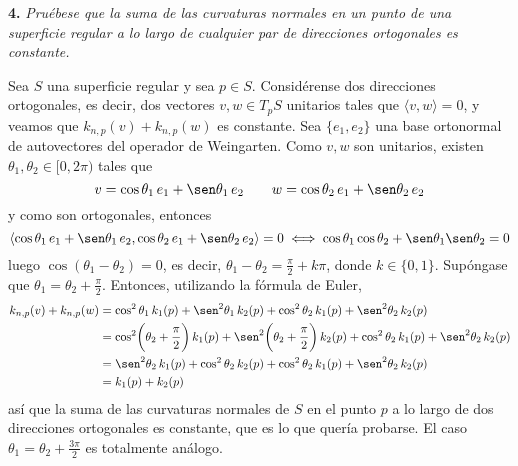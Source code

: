 \documentclass[12pt]{report}
\begin{document}
\vspace{4mm}
\textbf{4.} \textit{Pruébese que la suma de las curvaturas normales en un punto de una superficie regular a lo largo de cualquier par de direcciones ortogonales es constante.} 

\vspace{2mm}
Sea $S$ una superficie regular y sea $p \in S$. Considérense dos direcciones ortogonales, es decir, dos vectores $v,w \in T_pS$ unitarios tales que $\langle v,w \rangle =0$, y veamos que $k_{n,p}(v)+k_{n,p}(w)$ es constante. Sea $\{e_1,e_2\}$ una base ortonormal de autovectores del operador de Weingarten. Como $v,w$ son unitarios, existen $\theta_1,\theta_2 \in [0,2\pi)$ tales que
\[v = \cos\theta_1 \, e_1+\sen\theta_1 \, e_2 \qquad w = \cos\theta_2 \, e_1+\sen\theta_2 \, e_2\]
y como son ortogonales, entonces
\[
\langle \cos\theta_1 \, e_1+\sen\theta_1 \, e_2, \cos\theta_2 \, e_1+\sen\theta_2 \, e_2 \rangle = 0 \iff \cos \theta_1 \cos \theta_2 + \sen\theta_1 \sen\theta_2 = 0
\]
luego $\cos(\theta_1-\theta_2) = 0$, es decir, $\theta_1-\theta_2 = \frac{\pi}{2}+k\pi$, donde $k \in \{0,1\}$. Supóngase que $\theta_1 = \theta_2 + \frac{\pi}{2}$. Entonces, utilizando la fórmula de Euler,
\[
\begin{aligned}[t]
    k_{n,p}(v)+k_{n,p}(w) &= \cos^2\theta_1 \, k_1(p)+\sen^2\theta_1 \, k_2(p)+\cos^2\theta_2 \, k_1(p)+\sen^2\theta_2 \, k_2(p) \\
    &= \cos^2\biggl(\theta_2+\frac{\pi}{2} \biggr) \, k_1(p)+\sen^2 \biggl(\theta_2+\frac{\pi}{2} \biggr) \, k_2(p) + \cos^2\theta_2 \, k_1(p)+\sen^2\theta_2 \, k_2(p) \\
    &= \sen^2\theta_2 \, k_1(p)+\cos^2\theta_2 \, k_2(p) + \cos^2\theta_2 \, k_1(p)+\sen^2\theta_2 \, k_2(p) \\
    &= k_1(p)+k_2(p)
\end{aligned}
\]
así que la suma de las curvaturas normales de $S$ en el punto $p$ a lo largo de dos direcciones ortogonales es constante, que es lo que quería probarse. El caso $\theta_1 = \theta_2 + \frac{3\pi}{2}$ es totalmente análogo.
\end{document}
